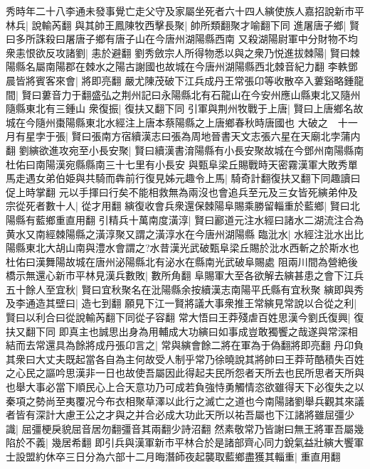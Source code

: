 秀時年二十八李通未發事覺亡走父守及家屬坐死者六十四人縯使族人嘉招說新市平林兵|{
	說輸芮翻}
與其帥王鳳陳牧西擊長聚|{
	帥所類翻聚才喻翻下同}
進屠唐子鄉|{
	賢曰多所誅殺曰屠唐子鄉有唐子山在今唐州湖陽縣西南}
又殺湖陽尉軍中分財物不均衆恚恨欲反攻諸劉|{
	恚於避翻}
劉秀斂宗人所得物悉以與之衆乃悦進拔棘陽|{
	賢曰棘陽縣名屬南陽郡在棘水之陽古謝國也故城在今唐州湖陽縣西北棘音紀力翻}
李軼鄧晨皆將賓客來會|{
	將即亮翻}
嚴尤陳茂破下江兵成丹王常張卬等收散卒入蔞谿略鍾龍間|{
	賢曰蔞音力于翻盛弘之荆州記曰永陽縣北有石龍山在今安州應山縣東北又隨州隨縣東北有三鍾山}
衆復振|{
	復扶又翻下同}
引軍與荆州牧戰于上唐|{
	賢曰上唐鄉名故城在今隨州棗陽縣東北水經注上唐本蔡陽縣之上唐鄉春秋時唐國也}
大破之　十一月有星孛于張|{
	賢曰張南方宿續漢志曰張為周地晉書天文志張六星在天廟北孛蒲内翻}
劉縯欲進攻宛至小長安聚|{
	賢曰續漢書淯陽縣有小長安聚故城在今鄧州南陽縣南杜佑曰南陽漢宛縣縣南三十七里有小長安}
與甄阜梁丘賜戰時天密霧漢軍大敗秀單馬走遇女弟伯姫與共騎而犇前行復見姊元趣令上馬|{
	騎奇計翻復扶又翻下同趣讀曰促上時掌翻}
元以手揮曰行矣不能相救無為兩沒也會追兵至元及三女皆死縯弟仲及宗從死者數十人|{
	從才用翻}
縯復收會兵衆還保棘陽阜賜乘勝留輜重於藍鄉|{
	賢曰北陽縣有藍鄉重直用翻}
引精兵十萬南度潢淳|{
	賢曰酈道元注水經曰諸水二湖流注合為黄水又南經棘陽縣之潢淳聚又謂之潢淳水在今唐州湖陽縣}
臨沘水|{
	水經注沘水出比陽縣東北大胡山南與澧水會謂之?水昔漢光武破甄阜梁丘賜於沘水西斬之於斯水也杜佑曰漢舞陽故城在唐州泌陽縣北有泌水在縣南光武破阜賜處}
阻兩川間為營絶後橋示無還心新市平林見漢兵數敗|{
	數所角翻}
阜賜軍大至各欲解去縯甚患之會下江兵五十餘人至宜秋|{
	賢曰宜秋聚名在沘陽縣余按續漢志南陽平氏縣有宜秋聚}
縯即與秀及李通造其壁曰|{
	造七到翻}
願見下江一賢將議大事衆推王常縯見常說以合從之利|{
	賢曰以利合曰從說輸芮翻下同從子容翻}
常大悟曰王莽殘虐百姓思漢今劉氏復興|{
	復扶又翻下同}
即真主也誠思出身為用輔成大功縯曰如事成豈敢獨饗之哉遂與常深相結而去常還具為餘將成丹張卬言之|{
	常與縯會餘二將在軍為于偽翻將即亮翻}
丹卬負其衆曰大丈夫既起當各自為主何故受人制乎常乃徐曉說其將帥曰王莽苛酷積失百姓之心民之謳吟思漢非一日也故使吾屬因此得起夫民所怨者天所去也民所思者天所與也舉大事必當下順民心上合天意功乃可成若負強恃勇觸情恣欲雖得天下必復失之以秦項之勢尚至夷覆况今布衣相聚草澤以此行之滅亡之道也今南陽諸劉舉兵觀其來議者皆有深計大慮王公之才與之并合必成大功此天所以祐吾屬也下江諸將雖屈彊少識|{
	屈彊梗戾貌屈音居勿翻彊音其兩翻少詩沼翻}
然素敬常乃皆謝曰無王將軍吾屬幾陷於不義|{
	幾居希翻}
即引兵與漢軍新市平林合於是諸部齊心同力銳氣益壯縯大饗軍士設盟約休卒三日分為六部十二月晦潛師夜起襲取藍鄉盡獲其輜重|{
	重直用翻}



